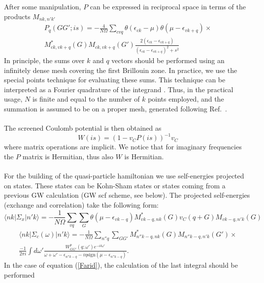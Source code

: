 \documentclass[11pt]{article}
\begin{document}
After some manipulation, $P$ can be expressed in reciprocal
space in terms of the products $M_{nk,n'k'}$
\begin{multline}\label{eq:polarizability-in-plane-waves}
P_q(GG';is) = - \frac{4}{N\Omega}
  \sum_{cvq}
  \theta(\epsilon_{ck}-\mu)
  \theta(\mu-\epsilon_{vk+q})
\times \\
M_{ck,vk+q}^*(G) M_{ck,vk+q}(G')
\frac{2(\epsilon_{ck}-\epsilon_{vk+q})}{(\epsilon_{ck}-\epsilon_{vk+q})^2
+s^2}
\end{multline}
In principle, the sums over $k$ and $q$ vectors should be performed
using an infinitely dense mesh covering the first
Brillouin zone. In practice, we use the special points
technique \cite{chad-cohe73prb} for evaluating these sums.
This technique can be interpreted as a Fourier quadrature
of the integrand \cite{froy89prb}.
Thus, in the practical usage, $N$ is finite and
equal to the number of $k$ points employed, and
the summation is assumed to be on a proper mesh, generated
following Ref.~\cite{froy89prb}.
\\
\\
The screened Coulomb potential is then obtained as
\begin{equation}\label{eq:RPA}
W(is)=(1-v_CP(is))^{-1}v_C
\end{equation}
where matrix operations are implicit.
We notice that for imaginary frequencies the $P$ matrix is
Hermitian, thus also $W$ is Hermitian.
\\
\\
For the building of the quasi-particle hamiltonian we use self-energies projected on states.
These states can be Kohn-Sham states or states coming from a previous GW calculation (GW scf scheme, see below).
The projected self-energies (exchange and correlation) take the following form:
\begin{equation}
\langle nk | \Sigma_x | n'k \rangle
=
- \frac{1}{N\Omega} \sum_{vq} \sum_G \theta(\mu-\epsilon_{vk-q})
M^*_{vk-q,nk}(G) v_C(q+G) M_{vk-q,n'k}(G)
\end{equation}
\begin{multline}\label{eq:correlation_part_of_self_energy_in_plane_waves}
\langle nk | \Sigma_c(\omega) | n'k \rangle
=
- \frac{1}{N\Omega} \sum_{n''q} \sum_{GG'}
M^*_{n''k-q,nk}(G) M_{n''k-q,n'k}(G')
\times \\
\frac{-1}{2\pi i}\int d\omega'\frac{W^p_{GG'}(q;\omega')e^{-i\delta\omega'}}{
\omega + \omega' - \epsilon_{n''k-q} - i\eta\text{sign}(\mu-\epsilon_{n''k-q})}. 
\end{multline}
In the case of equation (\ref{Farid}), the calculation of the last integral should be performed
\end{document}
